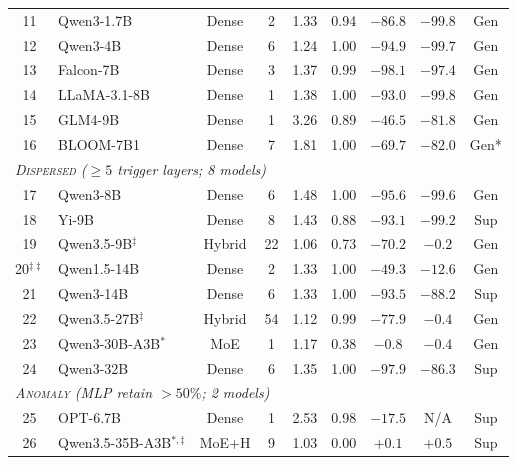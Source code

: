 \documentclass{article}
\begin{document}
\begin{table}[t]
\begin{tabular*}{\textwidth}{@{\extracolsep{\fill}}clccccccc@{}}
    11  & Qwen3-1.7B                 & Dense & 2  & 1.33 & 0.94 & $-86.8$ & $-99.8$  & Gen  \\
    12  & Qwen3-4B                   & Dense & 6  & 1.24 & 1.00 & $-94.9$ & $-99.7$  & Gen  \\
    13  & Falcon-7B                  & Dense & 3  & 1.37 & 0.99 & $-98.1$ & $-97.4$  & Gen  \\
    14  & LLaMA-3.1-8B               & Dense & 1  & 1.38 & 1.00 & $-93.0$ & $-99.8$  & Gen  \\
    15  & GLM4-9B                    & Dense & 1  & 3.26 & 0.89 & $-46.5$ & $-81.8$  & Gen  \\
    16  & BLOOM-7B1                  & Dense & 7  & 1.81 & 1.00 & $-69.7$ & $-82.0$  & Gen* \\
    \midrule
    \multicolumn{9}{l}{\textit{\textsc{Dispersed} ($\geq 5$ trigger layers; 8 models)}} \\
    \midrule
    17  & Qwen3-8B                   & Dense  & 6  & 1.48 & 1.00 & $-95.6$ & $-99.6$  & Gen  \\
    18  & Yi-9B                      & Dense  & 8  & 1.43 & 0.88 & $-93.1$ & $-99.2$  & Sup  \\
    19  & Qwen3.5-9B$^{\ddagger}$    & Hybrid & 22 & 1.06 & 0.73 & $-70.2$ & $-0.2$   & Gen  \\
    20$^{\ddagger\ddagger}$ & Qwen1.5-14B & Dense  & 2  & 1.33 & 1.00 & $-49.3$ & $-12.6$  & Gen  \\
    21  & Qwen3-14B                  & Dense  & 6  & 1.33 & 1.00 & $-93.5$ & $-88.2$  & Sup  \\
    22  & Qwen3.5-27B$^{\ddagger}$   & Hybrid & 54 & 1.12 & 0.99 & $-77.9$ & $-0.4$   & Gen  \\
    23  & Qwen3-30B-A3B$^{\ast}$     & MoE    & 1  & 1.17 & 0.38 & $-0.8$  & $-0.4$   & Gen  \\
    24  & Qwen3-32B                  & Dense  & 6  & 1.35 & 1.00 & $-97.9$ & $-86.3$  & Sup  \\
    \midrule
    \multicolumn{9}{l}{\textit{\textsc{Anomaly} (MLP retain $> 50\%$; 2 models)}} \\
    \midrule
    25  & OPT-6.7B                   & Dense  & 1  & 2.53 & 0.98 & $-17.5$ & N/A      & Sup  \\
    26  & Qwen3.5-35B-A3B$^{\ast,\ddagger}$ & MoE+H & 9  & 1.03 & 0.00 & $+0.1$  & $+0.5$   & Sup  \\
    \bottomrule
  \end{tabular*}
  \endgroup


\end{table}
\end{document}
